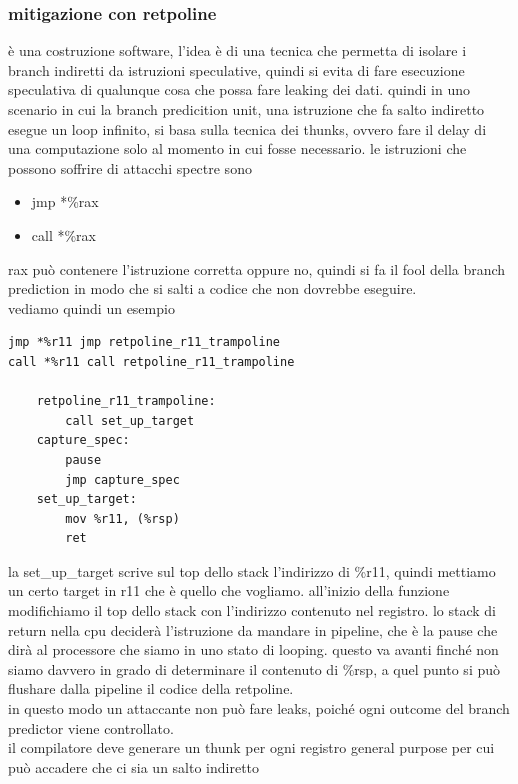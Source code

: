 \documentclass[12pt, oneside]{extbook} %
\begin{document}
\subsubsection{mitigazione con retpoline}
è una costruzione software, l'idea è di una tecnica che permetta di isolare i branch indiretti da istruzioni speculative, quindi si evita di fare esecuzione speculativa di qualunque cosa che possa fare leaking dei dati. quindi in uno scenario in cui la branch predicition unit, una istruzione che fa salto indiretto esegue un loop infinito, si basa sulla tecnica dei thunks, ovvero fare il delay di una computazione solo al momento in cui fosse necessario. le istruzioni che possono soffrire di attacchi spectre sono
\begin{itemize}
\item jmp *\%rax
\item call *\%rax
\end{itemize}
rax può contenere l'istruzione corretta oppure no, quindi si fa il fool della branch prediction in modo che si salti a codice che non dovrebbe eseguire.\\vediamo quindi un esempio
\begin{lstlisting}
jmp *%r11 jmp retpoline_r11_trampoline
call *%r11 call retpoline_r11_trampoline

	retpoline_r11_trampoline:
		call set_up_target
	capture_spec:
		pause
		jmp capture_spec
	set_up_target:
		mov %r11, (%rsp)
		ret
\end{lstlisting}
la \textsf{set\_up\_target} scrive sul top dello stack l'indirizzo di \%r11, quindi mettiamo un certo target in r11 che è quello che vogliamo. all'inizio della funzione modifichiamo il top dello stack con l'indirizzo contenuto nel registro. lo stack di return nella cpu deciderà l'istruzione da mandare in pipeline, che è la pause che dirà al processore che siamo in uno stato di looping. questo va avanti finché non siamo davvero in grado di determinare il contenuto di \%rsp, a quel punto si può flushare dalla pipeline il codice della retpoline.\\in questo modo un attaccante non può fare leaks, poiché ogni outcome del branch predictor viene controllato.\\il compilatore deve generare un thunk per ogni registro general purpose per cui può accadere che ci sia un salto indiretto
\end{document}
